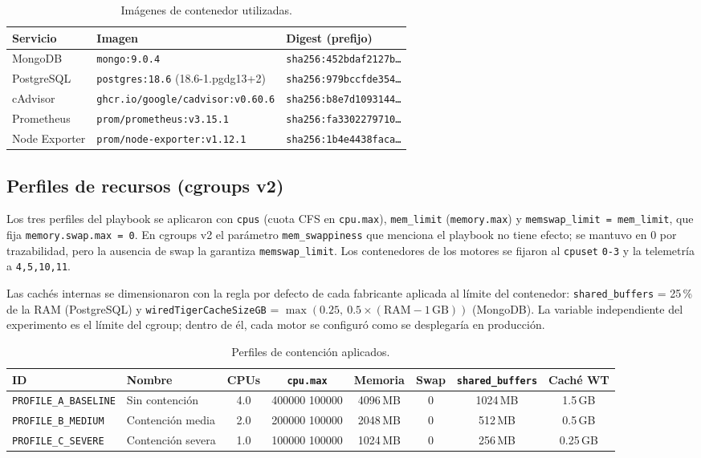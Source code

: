 \documentclass[11pt,a4paper]{article}
\begin{document}
\begin{table}[H]
\centering\footnotesize
\caption{Imágenes de contenedor utilizadas.}\label{tab:imagenes}
\begin{tabular}{lll}
\toprule
Servicio & Imagen & Digest (prefijo) \\
\midrule
MongoDB & \texttt{mongo:9.0.4} & \texttt{sha256:452bdaf2127b\ldots} \\
PostgreSQL & \texttt{postgres:18.6} (18.6-1.pgdg13+2) & \texttt{sha256:979bccfde354\ldots} \\
cAdvisor & \texttt{ghcr.io/google/cadvisor:v0.60.6} & \texttt{sha256:b8e7d1093144\ldots} \\
Prometheus & \texttt{prom/prometheus:v3.15.1} & \texttt{sha256:fa3302279710\ldots} \\
Node Exporter & \texttt{prom/node-exporter:v1.12.1} & \texttt{sha256:1b4e4438faca\ldots} \\
\bottomrule
\end{tabular}
\end{table}

\subsection{Perfiles de recursos (cgroups v2)}

Los tres perfiles del playbook se aplicaron con \texttt{cpus} (cuota CFS en \texttt{cpu.max}), \texttt{mem\_limit} (\texttt{memory.max}) y \texttt{memswap\_limit = mem\_limit}, que fija \texttt{memory.swap.max = 0}. En cgroups v2 el parámetro \texttt{mem\_swappiness} que menciona el playbook no tiene efecto; se mantuvo en 0 por trazabilidad, pero la ausencia de swap la garantiza \texttt{memswap\_limit}. Los contenedores de los motores se fijaron al \texttt{cpuset} \texttt{0-3} y la telemetría a \texttt{4,5,10,11}.

Las cachés internas se dimensionaron con la regla por defecto de cada fabricante aplicada al límite del contenedor: \texttt{shared\_buffers} = 25\,\% de la RAM (PostgreSQL) y \texttt{wiredTigerCacheSizeGB} = $\max(0.25,\ 0.5\times(\text{RAM}-1\,\text{GB}))$ (MongoDB). La variable independiente del experimento es el límite del cgroup; dentro de él, cada motor se configuró como se desplegaría en producción.

\begin{table}[H]
\centering\small
\caption{Perfiles de contención aplicados.}\label{tab:perfiles}
\footnotesize\setlength{\tabcolsep}{4pt}
\begin{tabular}{llcccccc}
\toprule
ID & Nombre & CPUs & \texttt{cpu.max} & Memoria & Swap & \texttt{shared\_buffers} & Caché WT \\
\midrule
\texttt{PROFILE\_A\_BASELINE} & Sin contención & 4.0 & 400000 100000 & 4096\,MB & 0 & 1024\,MB & 1.5\,GB \\
\texttt{PROFILE\_B\_MEDIUM} & Contención media & 2.0 & 200000 100000 & 2048\,MB & 0 & 512\,MB & 0.5\,GB \\
\texttt{PROFILE\_C\_SEVERE} & Contención severa & 1.0 & 100000 100000 & 1024\,MB & 0 & 256\,MB & 0.25\,GB \\
\bottomrule
\end{tabular}
\end{table}
\end{document}
